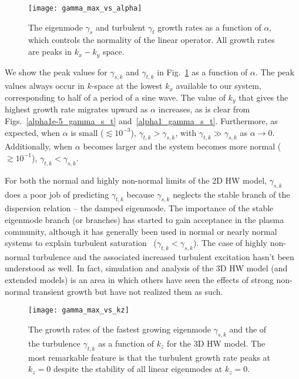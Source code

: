 \documentclass[letter,scriptaddress,twocolumn, prl,showkeys]{revtex4}
\begin{document}
\begin{figure}
\centerline{\texttt{[image: gamma\_max\_vs\_alpha]}}
\caption{The eigenmode $\gamma_{s}$ and turbulent $\gamma_{t}$ growth rates as a function of $\alpha$, which controls the normality of the linear operator. All growth rates are peaks in $k_x-k_y$ space.}
\label{gamma_max_vs_alpha}
\end{figure}

We show the peak values for $\gamma_{s,k}$ and $\gamma_{t,k}$ in Fig.~\ref{gamma_max_vs_alpha} as a function of $\alpha$. The peak values always occur in $k$-space
at the lowest $k_x$ available to our system, corresponding to half of a period of a sine wave. The value of $k_y$ that gives the highest growth rate migrates upward as $\alpha$ increases,
as is clear from Figs.~\ref{alpha1e-5_gamma_s_t} and~\ref{alpha1_gamma_s_t}. Furthermore, as expected, when $\alpha$ is small ($\lesssim 10^{-3}$), $\gamma_{t,k} > \gamma_{s,k}$, with
$\gamma_{t,k} \gg \gamma_{s,k}$ as $\alpha \to 0$. Additionally, when $\alpha$ becomes larger and the system becomes more normal ($\gtrsim 10^{-1}$), $\gamma_{t,k} < \gamma_{s,k}$.

For both the normal and highly non-normal limits of the 2D HW model, $\gamma_{s,k}$ does a poor job of predicting $\gamma_{t,k}$ because $\gamma_{s,k}$ neglects the stable branch of the
dispersion relation -- the damped eigenmode. The importance of the stable eigenmode branch (or branches) 
has started to gain acceptance in the plasma community, although it has generally been used in normal
or nearly normal systems to explain turbulent saturation~\cite{terry2006b} ($\gamma_{t,k} < \gamma_{s,k}$). The case of highly non-normal turbulence and the associated increased turbulent excitation
hasn't been understood as well. In fact, simulation and analysis of the 3D HW model (and extended models) is an area in which others have seen the effects of strong non-normal transient growth
but have not realized them as such.


\begin{figure}
\centerline{\texttt{[image: gamma\_max\_vs\_kz]}}
\caption{The growth rates of the fastest growing eigenmode $\gamma_{s,k}$ and the of the turbulence $\gamma_{t,k}$ as a function of $k_z$ for the 3D HW model. The most remarkable feature is
that the turbulent growth rate peaks at $k_z=0$ despite the stability of all linear eigenmodes at $k_z=0$.}
\label{gamma_max_vs_kz}
\end{figure}
\end{document}

